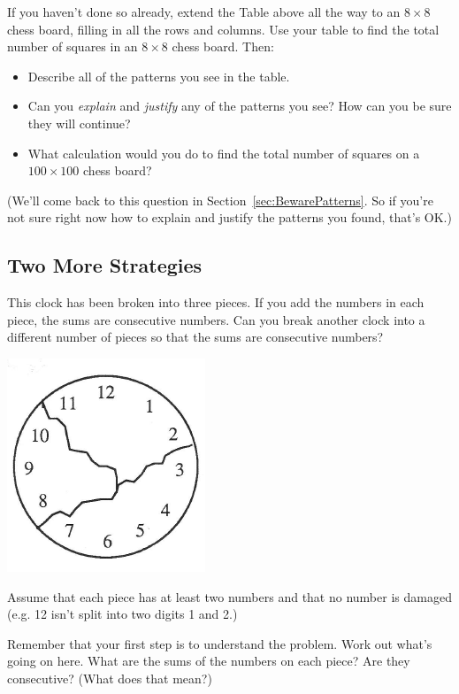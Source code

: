 \begin{thinkpair*}
If you haven't done so already, extend the Table above all the way to an $8\times 8$ chess board, filling in all the rows and columns.  Use your table to find the total number of squares in an $8 \times 8$ chess board.  Then:
\begin{itemize}
\item
Describe all of the patterns you see in the table.  
\item
Can you \emph{explain} and \emph{justify} any of the patterns you see?  How can you be sure they will continue?
\item
What calculation would you do to find the total number of squares on a $100 \times 100$ chess board?
\end{itemize}
\end{thinkpair*}

(We'll come back to this question in Section~\ref{sec:BewarePatterns}.  So if you're not sure right now how to explain and justify the patterns you found, that's OK.)



\subsection{Two More Strategies}
\begin{problem}\label{prob:BrokenClock}
 This clock has been broken into three pieces.  If you add the numbers in each piece, the sums are consecutive numbers.  Can you break another clock into a different number of pieces so that the sums are consecutive numbers?  
\begin{center}
\includegraphics[height=3 cm]{../Pictures/ProbSolvingPics/clock}
\end{center}
Assume that each piece has at least two numbers and that no number is damaged (e.g. 12 isn't split into two digits 1 and 2.) 
\end{problem}



Remember that your first step is to understand the problem.  Work out what's going on here.  What are the sums of the numbers on each piece?  Are they consecutive?  (What does that mean?)

